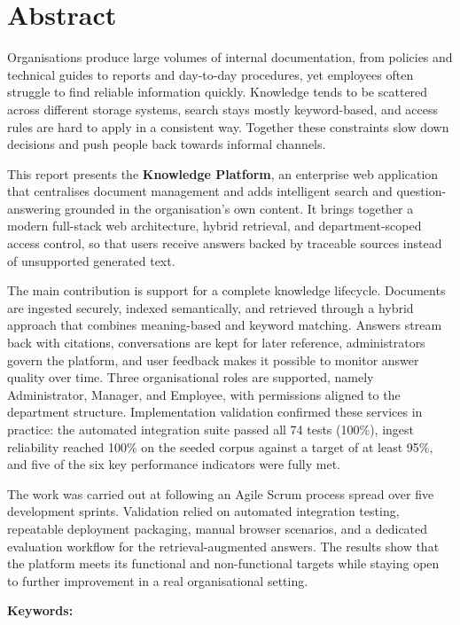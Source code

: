 
\chapter*{Abstract}

\begingroup
{}

Organisations produce large volumes of internal documentation, from policies and
technical guides to reports and day-to-day procedures, yet employees often struggle
to find reliable information quickly. Knowledge tends to be scattered across
different storage systems, search stays mostly keyword-based, and access rules are
hard to apply in a consistent way. Together these constraints slow down decisions
and push people back towards informal channels.

This report presents the \textbf{Knowledge Platform}, an enterprise web application
that centralises document management and adds intelligent search and
question-answering grounded in the organisation's own content. It brings together a
modern full-stack web architecture, hybrid retrieval, and department-scoped access
control, so that users receive answers backed by traceable sources instead of
unsupported generated text.

The main contribution is support for a complete knowledge lifecycle. Documents are
ingested securely, indexed semantically, and retrieved through a hybrid approach
that combines meaning-based and keyword matching. Answers stream back with
citations, conversations are kept for later reference, administrators govern the
platform, and user feedback makes it possible to monitor answer quality over time.
Three organisational roles are supported, namely Administrator, Manager, and
Employee, with permissions aligned to the department structure.
Implementation validation confirmed these services in practice: the automated
integration suite passed all 74 tests (100\%), ingest reliability reached 100\%
on the seeded corpus against a target of at least 95\%, and five of the six key
performance indicators were fully met.

The work was carried out at \CompanyName{} following an Agile Scrum process spread
over five development sprints. Validation relied on automated integration testing,
repeatable deployment packaging, manual browser scenarios, and a dedicated
evaluation workflow for the retrieval-augmented answers. The results show that the
platform meets its functional and non-functional targets while staying open to
further improvement in a real organisational setting.

\medskip
\noindent\textbf{Keywords:} \KeywordsEN
\endgroup
